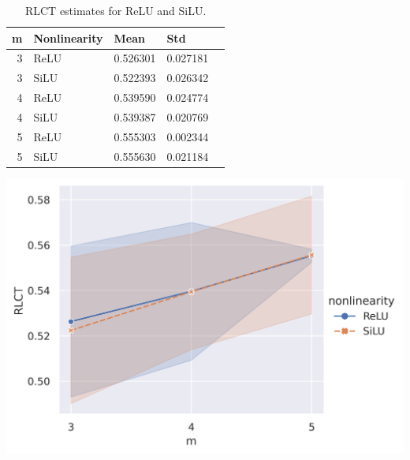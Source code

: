\documentclass{article} %
\begin{document}
\begin{table}
	\begin{minipage}{0.5\linewidth}
		\caption{\footnotesize RLCT estimates for ReLU and SiLU.}
		\label{table:hyper}
		\centering
		\begin{tabular}
			{r l l l l}
			\toprule
			\textbf{m}  & \textbf{Nonlinearity}  & \textbf{Mean} & \textbf{Std}\\ 
			\midrule
			3 & ReLU & 0.526301 & 0.027181\\
			3 & SiLU & 0.522393 & 0.026342\\
			4 & ReLU & 0.539590 & 0.024774\\
			4 & SiLU & 0.539387 & 0.020769\\
			5 & ReLU & 0.555303 & 0.002344\\
			5 & SiLU & 0.555630 & 0.021184\\
			\bottomrule
		\end{tabular}
	\end{minipage}\hfill
	\begin{minipage}{0.45\linewidth}
		\centering
		\includegraphics[scale=0.3]{RLCTplot.png}
		\label{fig:simp_func_complex2}
	\end{minipage}
\end{table}
\end{document}
